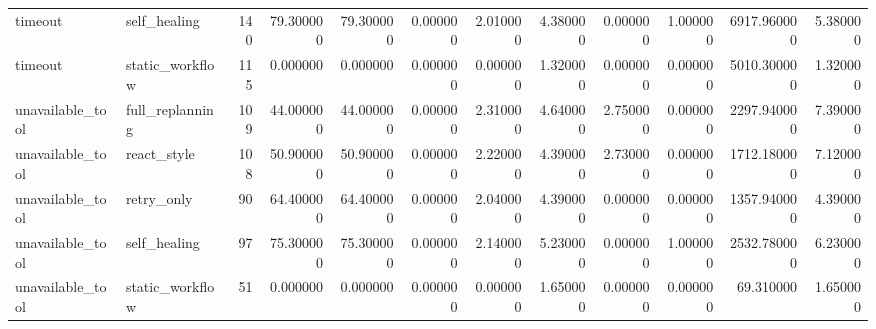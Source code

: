 \begin{tabular}{llrrrrrrrrrr}
timeout & self_healing & 140 & 79.300000 & 79.300000 & 0.000000 & 2.010000 & 4.380000 & 0.000000 & 1.000000 & 6917.960000 & 5.380000 \\
timeout & static_workflow & 115 & 0.000000 & 0.000000 & 0.000000 & 0.000000 & 1.320000 & 0.000000 & 0.000000 & 5010.300000 & 1.320000 \\
unavailable_tool & full_replanning & 109 & 44.000000 & 44.000000 & 0.000000 & 2.310000 & 4.640000 & 2.750000 & 0.000000 & 2297.940000 & 7.390000 \\
unavailable_tool & react_style & 108 & 50.900000 & 50.900000 & 0.000000 & 2.220000 & 4.390000 & 2.730000 & 0.000000 & 1712.180000 & 7.120000 \\
unavailable_tool & retry_only & 90 & 64.400000 & 64.400000 & 0.000000 & 2.040000 & 4.390000 & 0.000000 & 0.000000 & 1357.940000 & 4.390000 \\
unavailable_tool & self_healing & 97 & 75.300000 & 75.300000 & 0.000000 & 2.140000 & 5.230000 & 0.000000 & 1.000000 & 2532.780000 & 6.230000 \\
unavailable_tool & static_workflow & 51 & 0.000000 & 0.000000 & 0.000000 & 0.000000 & 1.650000 & 0.000000 & 0.000000 & 69.310000 & 1.650000 \\
\bottomrule
\end{tabular}
